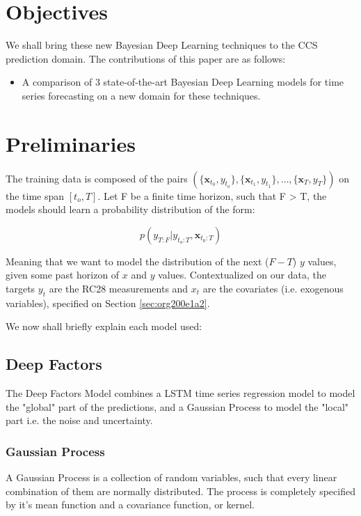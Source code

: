 \documentclass[11pt]{article}
\begin{document}
\section{Objectives}
\label{sec:org2a15808}

We shall bring these new Bayesian Deep Learning techniques to the CCS prediction domain. The contributions of this paper are 
as follows: 

\begin{itemize}
\item A comparison of 3 state-of-the-art Bayesian Deep Learning models for time series forecasting on a new domain for these techniques.
\end{itemize}

\section{Preliminaries}
\label{sec:org82835c3}

The training data is composed of the pairs \((\{\textbf{x}_{t_0},y_{t_o}\},\{\textbf{x}_{t_1},y_{t_1}\}, \dots, \{\textbf{x}_{T},y_{T}\})\) on the time span \([t_o,T]\). 
Let F be a finite time horizon, such that F > T, the models should learn a probability distribution of the form:

\begin{equation}
p(y_{T:F} | y_{t_{o}:T},\textbf{x}_{t_{0}:T}) 
\end{equation} 

Meaning that we want to model the distribution of the next (\(F-T\)) \(y\) values, given some past horizon of \(x\) and \(y\) values. Contextualized on our data, the targets \(y_t\)
are the RC28 measurements and \(x_t\) are the covariates (i.e. exogenous variables), specified on Section \ref{sec:org200e1a2}.

We now shall briefly explain each model used:

\subsection{Deep Factors \cite{deepfactors}}
\label{sec:org0764e10}

The Deep Factors Model combines a LSTM time series regression model to model the "global" part of the predictions, and a Gaussian Process to model the "local" part
i.e. the noise and uncertainty. 

\subsubsection{Gaussian Process}
\label{sec:org1a848e4}
A Gaussian Process \cite{gpml} is a collection of random variables, such that every linear combination of them are normally distributed. The process is completely specified by it's
mean function and a covariance function, or kernel. 
\end{document}
